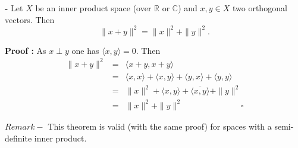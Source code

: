 \documentclass[12pt]{article}
\begin{document}
{\bf {} -} Let $X$ be an inner product space (over $\mathbb{R}$ or $\mathbb{C}$) and $x, y \in X$ two orthogonal vectors. Then
\begin{displaymath}
\|x+y\|^2 = \|x\|^2 + \|y\|^2.
\end{displaymath}

{\bf Proof :} As $x \perp y$ one has $\langle x, y \rangle = 0$. Then
\begin{eqnarray*}
\|x+y\|^2 & = & \langle x+y, x+y \rangle \\
& = & \langle x, x \rangle + \langle x, y \rangle + \langle y, x \rangle + \langle y, y \rangle \\
& = & \|x\|^2 + \langle x, y \rangle + \overline{\langle x, y \rangle} +\|y\|^2 \\
& = & \|x\|^2 + \|y\|^2 \qquad\qquad\qquad\quad \square
\end{eqnarray*}

$Remark -$ This theorem is valid (with the same proof) for spaces with a semi-definite inner product.
\end{document}
